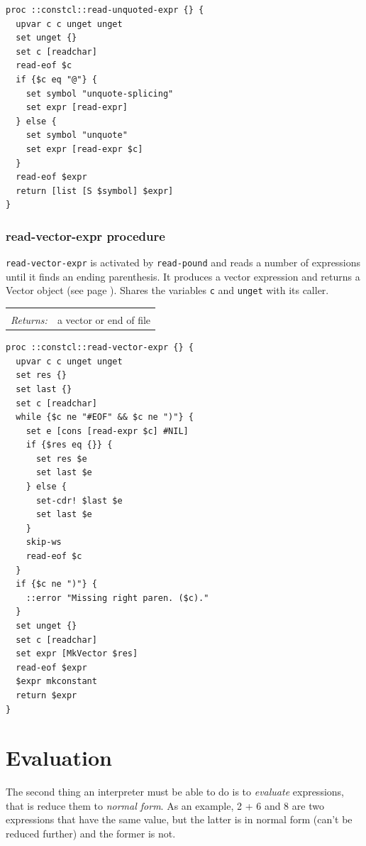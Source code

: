 \documentclass[twoside]{report}
\begin{document}
\begin{lstlisting}
proc ::constcl::read-unquoted-expr {} {
  upvar c c unget unget
  set unget {}
  set c [readchar]
  read-eof $c
  if {$c eq "@"} {
    set symbol "unquote-splicing"
    set expr [read-expr]
  } else {
    set symbol "unquote"
    set expr [read-expr $c]
  }
  read-eof $expr
  return [list [S $symbol] $expr]
}
\end{lstlisting}

\subsection{read-vector-expr procedure}
\label{readvectorexpr-procedure}

\texttt{read-vector-expr} is activated by \texttt{read-pound} and reads a number of expressions until it finds an ending parenthesis. It produces a vector expression and returns a Vector object (see page \pageref{vectors}). Shares the variables \texttt{c} and \texttt{unget} with its caller.

\noindent\begin{tabular}{ |p{1.9cm} p{8cm}| }
\hline
\rowcolor[HTML]{CCCCCC} \multicolumn{2}{|l|}{\bf read-vector-expr (internal)} \\
\textit{Returns:} & a vector or end of file \\
\hline
\end{tabular}

\begin{lstlisting}
proc ::constcl::read-vector-expr {} {
  upvar c c unget unget
  set res {}
  set last {}
  set c [readchar]
  while {$c ne "#EOF" && $c ne ")"} {
    set e [cons [read-expr $c] #NIL]
    if {$res eq {}} {
      set res $e
      set last $e
    } else {
      set-cdr! $last $e
      set last $e
    }
    skip-ws
    read-eof $c
  }
  if {$c ne ")"} {
    ::error "Missing right paren. ($c)."
  }
  set unget {}
  set c [readchar]
  set expr [MkVector $res]
  read-eof $expr
  $expr mkconstant
  return $expr
}
\end{lstlisting}

\chapter{Evaluation}
\label{evaluation}

The second thing an interpreter must be able to do is to \emph{evaluate} expressions, that is reduce them to \emph{normal form}. As an example, 2 + 6 and 8 are two expressions that have the same value, but the latter is in normal form (can't be reduced further) and the former is not.
\end{document}
